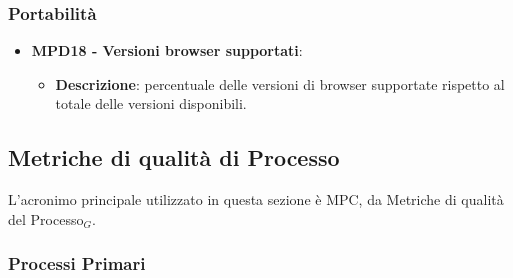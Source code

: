 \documentclass[10pt]{article}
\begin{document}
\begin{justify}
\subsubsection{Portabilità}
  \begin{itemize}
    \item \textbf{MPD18 - Versioni browser supportati}:
      \begin{itemize}
        \item \textbf{Descrizione}: percentuale delle versioni di browser supportate rispetto al totale delle versioni disponibili.
      \end{itemize}
\end{itemize}

\subsection{Metriche di qualità di Processo}
L'acronimo principale utilizzato in questa sezione è MPC, da Metriche di qualità del Processo$_G$.

\subsubsection{Processi Primari}

\end{justify}
\end{document}
